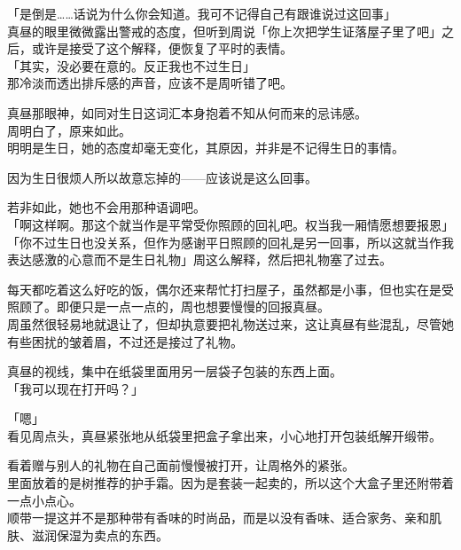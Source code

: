 「是倒是……话说为什么你会知道。我可不记得自己有跟谁说过这回事」\\

真昼的眼里微微露出警戒的态度，但听到周说「你上次把学生证落屋子里了吧」之后，或许是接受了这个解释，便恢复了平时的表情。\\

「其实，没必要在意的。反正我也不过生日」\\

那冷淡而透出排斥感的声音，应该不是周听错了吧。

真昼那眼神，如同对生日这词汇本身抱着不知从何而来的忌讳感。\\%

周明白了，原来如此。\\

明明是生日，她的态度却毫无变化，其原因，并非是不记得生日的事情。

因为生日很烦人所以故意忘掉的——应该说是这么回事。

若非如此，她也不会用那种语调吧。\\

「啊这样啊。那这个就当作是平常受你照顾的回礼吧。权当我一厢情愿想要报恩」\\

「你不过生日也没关系，但作为感谢平日照顾的回礼是另一回事，所以这就当作我表达感激的心意而不是生日礼物」周这么解释，然后把礼物塞了过去。

每天都吃着这么好吃的饭，偶尔还来帮忙打扫屋子，虽然都是小事，但也实在是受照顾了。即便只是一点一点的，周也想要慢慢的回报真昼。\\

周虽然很轻易地就退让了，但却执意要把礼物送过来，这让真昼有些混乱，尽管她有些困扰的皱着眉，不过还是接过了礼物。

真昼的视线，集中在纸袋里面用另一层袋子包装的东西上面。\\

「我可以现在打开吗？」

「嗯」\\

看见周点头，真昼紧张地从纸袋里把盒子拿出来，小心地打开包装纸解开缎带。

看着赠与别人的礼物在自己面前慢慢被打开，让周格外的紧张。\\

里面放着的是树推荐的护手霜。因为是套装一起卖的，所以这个大盒子里还附带着一点小点心。\\

顺带一提这并不是那种带有香味的时尚品，而是以没有香味、适合家务、亲和肌肤、滋润保湿为卖点的东西。

